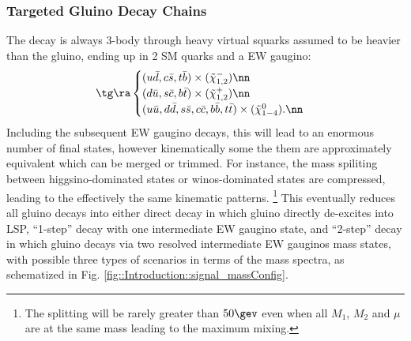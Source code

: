


\subsubsection{Targeted Gluino Decay Chains} \label{sec::Introduction::targetModels}
The decay is always 3-body through heavy virtual squarks assumed to be heavier than the gluino, ending up in 2 SM quarks and a EW gaugino:
\begin{align}
\tg \ra 
  \begin{cases}
    (u\bar{d}, c\bar{s}, t\bar{b}) \times (\tilde{\chi}_{1,2}^{-}) \nn \\
    (d\bar{u}, s\bar{c}, b\bar{t}) \times (\tilde{\chi}_{1,2}^{+})  \nn \\
    (u\bar{u},d\bar{d},s\bar{s},c\bar{c},b\bar{b},t\bar{t}) \times (\tilde{\chi}_{1-4}^{0}). \nn 
  \end{cases}
\label{eq::gluinoDecays}
\end{align}
Including the subsequent EW gaugino decays, this will lead to an enormous number of final states,
however kinematically some the them are approximately equivalent which can be merged or trimmed. 
For instance, the mass spiliting between higgsino-dominated states or winos-dominated states are compressed, leading to the effectively the same kinematic patterns. 
\footnote{The splitting will be rarely greater than $50\gev$ even when all $M_1$, $M_2$ and $\mu$ are at the same mass leading to the maximum mixing.} 
This eventually reduces all gluino decays into either direct decay in which gluino directly de-excites into LSP, ``1-step'' decay with one intermediate EW gaugino state, and ``2-step'' decay in which gluino decays via two resolved intermediate EW gauginos mass states, with possible three types of scenarios in terms of the  mass spectra, as schematized in Fig. \ref{fig::Introduction::signal_massConfig}.



